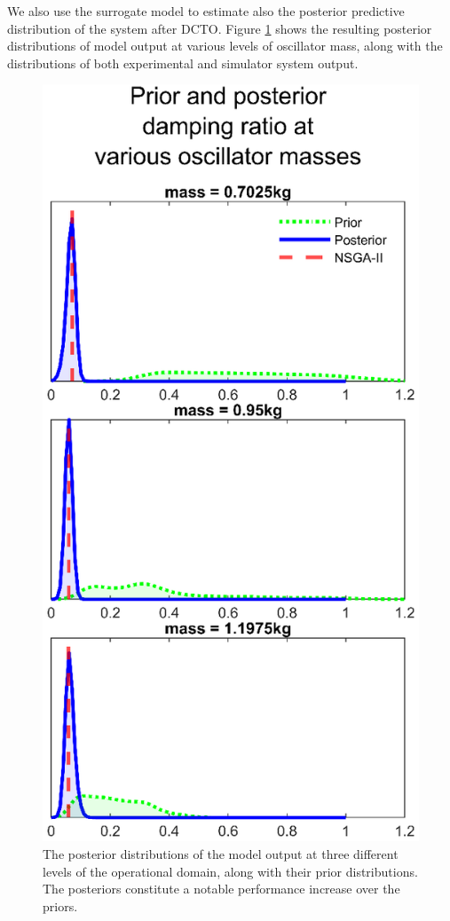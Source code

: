 \documentclass[twocolumn,10pt]{asme2ej}
\begin{document}
%
We also use the surrogate model to estimate also the posterior predictive distribution of the system after DCTO.
%
Figure \ref{fig:dvs_output} shows the resulting posterior distributions of model output at various levels of oscillator mass, along with the distributions of both experimental and simulator system output.
%
\begin{figure}
	\centering
	\includegraphics[scale=0.85]{FIG_DVS_DCTO_prior_and_posterior_output}
	\captionsetup{width=.85\linewidth}
	\caption{The posterior distributions of the model output at three different levels of the operational domain, along with their prior distributions. The posteriors constitute a notable performance increase over the priors.}
	\label{fig:dvs_output}
\end{figure}
\end{document}
